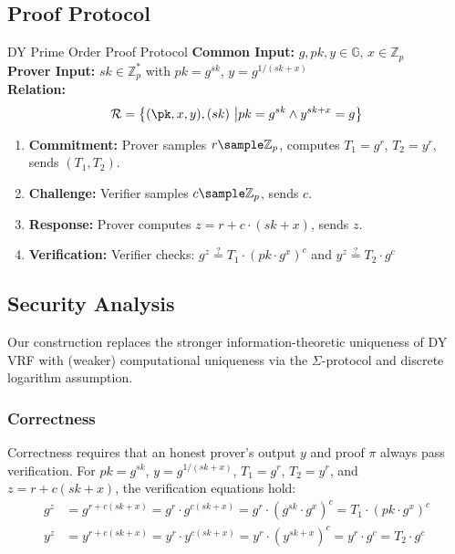 \subsection{Proof Protocol}
\begin{protocol}{DY Prime Order Proof Protocol}{}\label{protocol-pdy-protocol1}
\textbf{Common Input:} $g, pk, y \in \mathbb{G}$, $x \in \mathbb{Z}_p$ \\
\textbf{Prover Input:} $sk \in \mathbb{Z}_p^*$ with $pk = g^{sk}$, $y = g^{1/(sk + x)}$ \\
\textbf{Relation: }
\[
\mathcal{R} = \left\{ (\pk, x, y), (sk) \ \middle| pk = g^{sk} \land y^{sk + x} = g \right\}
\]
\begin{enumerate}
    \item \textbf{Commitment:} Prover samples $r \sample  \mathbb{Z}_p$, computes $T_1 = g^r$, $T_2 = y^r$, sends $(T_1, T_2)$.
    \item \textbf{Challenge:} Verifier samples $c \sample  \mathbb{Z}_p$, sends $c$.
    \item \textbf{Response:} Prover computes $z = r + c \cdot (sk + x)$, sends $z$.
    \item \textbf{Verification:} Verifier checks: $g^z \stackrel{?}{=} T_1 \cdot (pk \cdot g^x)^c$ and $y^z \stackrel{?}{=} T_2 \cdot g^c$
\end{enumerate}
\end{protocol}

\subsection{Security Analysis}

Our construction replaces the stronger information-theoretic uniqueness of DY VRF with (weaker) computational uniqueness via the $\Sigma$-protocol and discrete logarithm assumption.


\subsubsection{Correctness}

Correctness requires that an honest prover’s output $y$ and proof $\pi$ always pass verification. For $pk = g^{sk}$, $y = g^{1/(sk + x)}$, $T_1 = g^r$, $T_2 = y^r$, and $z = r + c(sk + x)$, the verification equations hold:
\begin{align*}
g^z &= g^{r + c(sk + x)} = g^r \cdot g^{c(sk + x)} = g^r \cdot (g^{sk} \cdot g^x)^c = T_1 \cdot (pk \cdot g^x)^c \\
y^z &= y^{r + c(sk + x)} = y^r \cdot y^{c(sk + x)} = y^r \cdot (y^{sk + x})^c = y^r \cdot g^c = T_2 \cdot g^c
\end{align*}

